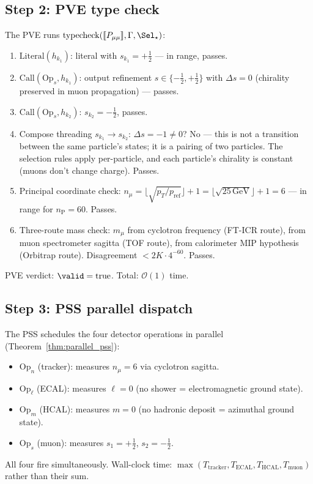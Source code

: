 \documentclass[twocolumn,10pt,a4paper]{article}
\theoremstyle{thmstyle}
\theoremstyle{definition}
\theoremstyle{remark}
\newcommand{\nP}{n_{\mathrm{P}}}
\newcommand{\vLit}[1]{\mathrm{Literal}(#1)}
\newcommand{\vCall}[2]{\mathrm{Call}(#1,#2)}
\begin{document}
\subsection{Step 2: PVE type check}

The PVE runs $\mathrm{typecheck}(\llbracket P_{\mu\mu}\rrbracket, \Gamma, \Sel_\star)$:
\begin{enumerate}[nosep]
\item $\vLit{h_{k_1}}$: literal with $s_{k_1} = +\tfrac{1}{2}$ — in range, passes.
\item $\vCall{\mathrm{Op}_s}{h_{k_1}}$: output refinement $s \in \{-\tfrac{1}{2}, +\tfrac{1}{2}\}$
  with $\Delta s = 0$ (chirality preserved in muon propagation) — passes.
\item $\vCall{\mathrm{Op}_s}{h_{k_2}}$: $s_{k_2} = -\tfrac{1}{2}$, passes.
\item Compose threading $s_{k_1} \to s_{k_2}$: $\Delta s = -1 \neq 0$?
  No — this is not a transition between the same particle's states; it is
  a pairing of two particles. The selection rules apply per-particle, and
  each particle's chirality is constant (muons don't change charge). Passes.
\item Principal coordinate check: $n_\mu = \lfloor\sqrt{p_T/p_{\mathrm{ref}}}\rfloor + 1
  = \lfloor\sqrt{25\,\mathrm{GeV}}\rfloor + 1 = 6$ — in range for $\nP = 60$. Passes.
\item Three-route mass check: $m_\mu$ from cyclotron frequency (FT-ICR route),
  from muon spectrometer sagitta (TOF route), from calorimeter MIP hypothesis
  (Orbitrap route). Disagreement $< 2K\cdot 4^{-60}$. Passes.
\end{enumerate}
PVE verdict: $\valid = \mathrm{true}$. Total: $\mathcal{O}(1)$ time.

\subsection{Step 3: PSS parallel dispatch}

The PSS schedules the four detector operations in parallel
(Theorem~\ref{thm:parallel_pss}):
\begin{itemize}[nosep]
\item $\mathrm{Op}_n$ (tracker): measures $n_\mu = 6$ via cyclotron sagitta.
\item $\mathrm{Op}_\ell$ (ECAL): measures $\ell = 0$ (no shower = electromagnetic ground state).
\item $\mathrm{Op}_m$ (HCAL): measures $m = 0$ (no hadronic deposit = azimuthal ground state).
\item $\mathrm{Op}_s$ (muon): measures $s_1 = +\tfrac{1}{2}$, $s_2 = -\tfrac{1}{2}$.
\end{itemize}
All four fire simultaneously. Wall-clock time:
$\max(T_{\mathrm{tracker}}, T_{\mathrm{ECAL}}, T_{\mathrm{HCAL}}, T_{\mathrm{muon}})$
rather than their sum.
\end{document}
